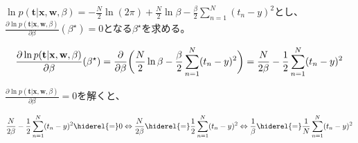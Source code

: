 $\ln p(\mathbf{t} | \mathbf{x}, \mathbf{w}, \beta) = -\frac{N}{2} \ln (2\pi) + \frac{N}{2} \ln \beta  - \frac{\beta}{2} \sum_{n=1}^N  (t_n - y)^2 $とし、$\frac{\partial  \ln p(\mathbf{t} | \mathbf{x}, \mathbf{w}, \beta) }{\partial \beta }(\beta^\star) = 0
$となる$\beta^\star$を求める。

\begin{dmath*}
	\frac{\partial  \ln p(\mathbf{t} | \mathbf{x}, \mathbf{w}, \beta) }{\partial \beta }(\beta^\star) \\
	= \frac{\partial}{\partial \beta}\bigg( \frac{N}{2} \ln \beta - \frac{\beta}{2} \sum_{n=1}^N  (t_n - y)^2   \bigg) \\
	= \frac{N}{2 \beta}  - \frac{1}{2} \sum_{n=1}^N  (t_n - y)^2  \\
\end{dmath*}

$\frac{\partial  \ln p(\mathbf{t} | \mathbf{x}, \mathbf{w}, \beta) }{\partial \beta } = 0$を解くと、

\begin{dmath*}
	\frac{N}{2 \beta}  - \frac{1}{2} \sum_{n=1}^N  (t_n - y)^2 \hiderel{=} 0 \\
	\Leftrightarrow  \frac{N}{2 \beta} \hiderel{=}  \frac{1}{2} \sum_{n=1}^N  (t_n - y)^2 \\
	\Leftrightarrow \frac{1}{\beta} \hiderel{=}  \frac{1}{N} \sum_{n=1}^N  (t_n - y)^2 \\
\end{dmath*} 

